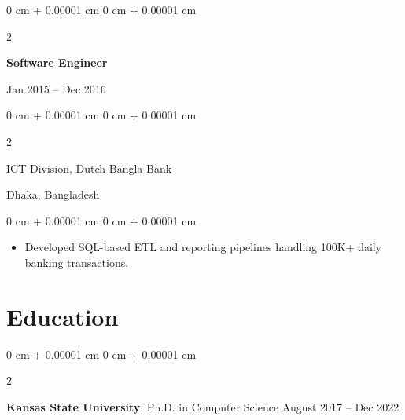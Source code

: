 \documentclass[10pt, letterpaper]{article}
\newenvironment{highlights}{
    \begin{itemize}[
        topsep=0.10 cm,
        parsep=0.10 cm,
        partopsep=0pt,
        itemsep=0pt,
        leftmargin=0 cm + 10pt
    ]
}{
    \end{itemize}
} %
\newenvironment{onecolentry}{
    \begin{adjustwidth}{
        0 cm + 0.00001 cm
    }{
        0 cm + 0.00001 cm
    }
}{
    \end{adjustwidth}
} %
\newenvironment{twocolentry}[2][]{
    \onecolentry
    \def\secondColumn{#2}
    \setcolumnwidth{\fill, 4.5 cm}
    \begin{paracol}{2}
}{
    \switchcolumn \raggedleft \secondColumn
    \end{paracol}
    \endonecolentry
} %
\begin{document}
    \vspace{0.1 cm}
    \begin{twocolentry}{Jan 2015 -- Dec 2016}
        \textbf{Software Engineer}
    \end{twocolentry}
    \begin{twocolentry}{Dhaka, Bangladesh}
       ICT Division, Dutch Bangla Bank
    \end{twocolentry}

    \begin{onecolentry}
        \begin{highlights}
            \item Developed SQL-based ETL and reporting pipelines handling 100K+ daily banking transactions.
        \end{highlights}
    \end{onecolentry}


\section{Education}
    
        \begin{twocolentry}{
            August 2017 – Dec 2022
        }
            \textbf{Kansas State University}, Ph.D. in Computer Science\end{twocolentry}

\end{document}
